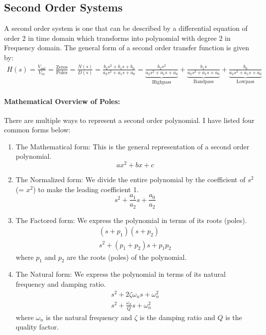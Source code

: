 \subsection{Second Order Systems}
\label{sec:theory_general_second_order}

A second order system is one that can be described by a
differential equation of order 2 in time domain which
transforms into polynomial with degree 2 in Frequency
domain. The general form of a second order transfer
function is given by:
\begin{align*}
  H(s) = \frac{V_{out}}{V_{in}} = \frac{\text{Zeros}}{\text{Poles}} = \frac{N(s)}{D(s)} = \frac{b_2 s^2 + b_1 s + b_0}{a_2 s^2 + a_1 s + a_0} = \underbrace{\frac{b_2 s^2}{a_2 s^2+a_1 s+a_0}}_{\text{Highpass}} + \underbrace{\frac{b_1 s}{a_2 s^2+a_1 s+a_0}}_{\text{Bandpass}} + \underbrace{\frac{b_0}{a_2 s^2+a_1 s+a_0}}_{\text{Lowpass}}
\end{align*}

\paragraph{Mathematical Overview of Poles:}
There are multiple ways to represent a second order
polynomial. I have listed four common forms below:
\begin{enumerate}
  \item The Mathematical form: This is the general representation
    of a second order polynomial.
    \begin{equation*}
      a x^2 + b x + c
    \end{equation*}
  \item The Normalized form: We divide the entire polynomial
    by the coefficient of \( s^2 \) (= \( x^2 \)) to make
    the leading coefficient 1.
    \begin{equation*}
      s^2 + \frac{a_1}{a_2}s + \frac{a_0}{a_2}
    \end{equation*}
  \item The Factored form: We express the polynomial
    in terms of its roots (poles).
    \begin{align*}
      (s + p_1)(s + p_2) \\
      s^2 + (p_1 + p_2)s + p_1 p_2
    \end{align*}
    where \( p_1 \) and \( p_2 \) are the roots (poles) of the polynomial.
  \item The Natural form: We express the polynomial
    in terms of its natural frequency and damping ratio.
    \begin{align*}
      s^2 + 2 \zeta \omega_n s + \omega_n^2 \\
      s^2 + \frac{\omega_n}{Q} s + \omega_n^2
    \end{align*}
    where \( \omega_n \) is the natural frequency and \( \zeta \) is the
    damping ratio and \( Q\) is the quality factor.
\end{enumerate}

